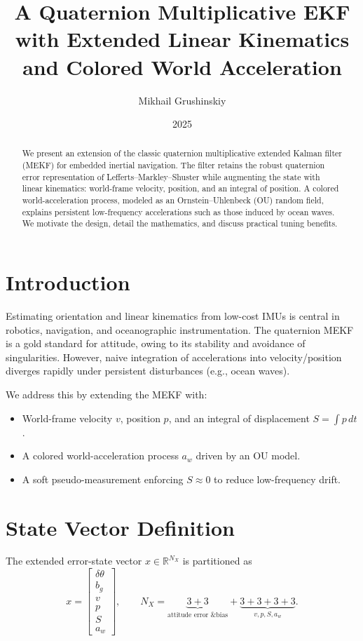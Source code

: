 \documentclass[11pt]{article}
\title{A Quaternion Multiplicative EKF with Extended Linear Kinematics and Colored World Acceleration}
\author{Mikhail Grushinskiy}
\date{2025}
\begin{document}
\maketitle

\begin{abstract}
We present an extension of the classic quaternion multiplicative extended Kalman filter (MEKF) for embedded inertial navigation. 
The filter retains the robust quaternion error representation of Lefferts--Markley--Shuster while augmenting the state with linear kinematics: world-frame velocity, position, and an integral of position. 
A colored world-acceleration process, modeled as an Ornstein--Uhlenbeck (OU) random field, explains persistent low-frequency accelerations such as those induced by ocean waves. 
We motivate the design, detail the mathematics, and discuss practical tuning benefits.
\end{abstract}

\section{Introduction}
Estimating orientation and linear kinematics from low-cost IMUs is central in robotics, navigation, and oceanographic instrumentation. 
The quaternion MEKF~\cite{lefferts1982,markley2003} is a gold standard for attitude, owing to its stability and avoidance of singularities. 
However, naive integration of accelerations into velocity/position diverges rapidly under persistent disturbances (e.g., ocean waves). 

We address this by extending the MEKF with:
\begin{itemize}
  \item World-frame velocity $v$, position $p$, and an integral of displacement $S=\int p\,dt$.
  \item A colored world-acceleration process $a_w$ driven by an OU model.
  \item A soft pseudo-measurement enforcing $S\approx 0$ to reduce low-frequency drift.
\end{itemize}

\section{State Vector Definition}
The extended error-state vector $x\in\mathbb{R}^{N_X}$ is partitioned as
\[
x = 
\begin{bmatrix}
\delta\theta \\ b_g \\ v \\ p \\ S \\ a_w
\end{bmatrix},
\qquad
N_X = \underbrace{3+3}_{\text{attitude error \& bias}} + \underbrace{3+3+3+3}_{v,p,S,a_w}.
\]
\end{document}
